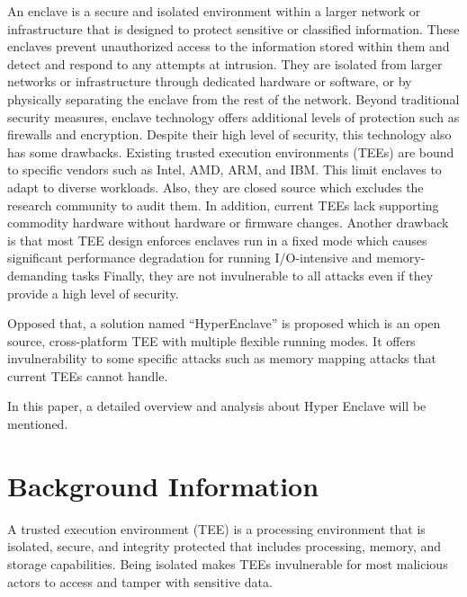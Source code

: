 An enclave is a secure and isolated environment within a larger network or infrastructure that is designed to protect sensitive or classified information. \cite{whitepaper} These enclaves prevent unauthorized access to the information stored within them and detect and respond to any attempts at intrusion. They are isolated from larger networks or infrastructure through dedicated hardware or software, or by physically separating the enclave from the rest of the network. Beyond traditional security measures, enclave technology offers additional levels of protection such as firewalls and encryption. Despite their high level of security, this technology also has some drawbacks. Existing trusted execution environments (TEEs) are bound to specific vendors such as Intel, AMD, ARM, and IBM. This limit enclaves to adapt to diverse workloads. Also, they are closed source which excludes the research community to audit them. In addition, current TEEs lack supporting commodity hardware without hardware or firmware changes. Another drawback is that most TEE design enforces enclaves run in a fixed mode which causes significant performance degradation for running I/O-intensive and memory-demanding tasks Finally, they are not invulnerable to all attacks even if they provide a high level of security. 

\noindent
Opposed that, a solution named “HyperEnclave” is proposed which is an open source, cross-platform TEE with multiple flexible running modes. It offers invulnerability to some specific attacks such as memory mapping attacks that current TEEs cannot handle. 

\noindent
In this paper, a detailed overview and analysis about Hyper Enclave will be mentioned.


\section{Background Information}
A trusted execution environment (TEE) is a processing environment that is isolated, secure, and integrity protected that includes processing, memory, and storage capabilities.
\cite{sabt:hal-01246364}
Being isolated makes TEEs invulnerable for most malicious actors to access and tamper with sensitive data. \cite{10.1145/2508859.2516758}


